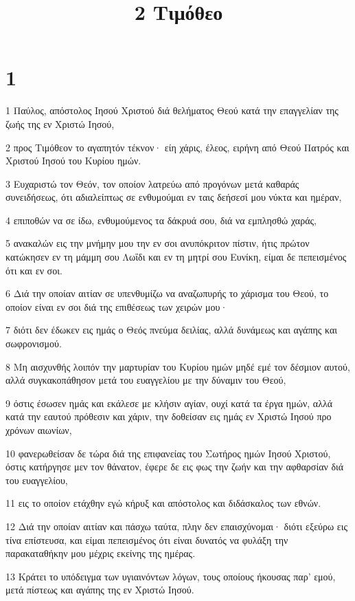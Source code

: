 

\title{2 Τιμόθεο}


\chapter{1}

\par 1 Παύλος, απόστολος Ιησού Χριστού διά θελήματος Θεού κατά την επαγγελίαν της ζωής της εν Χριστώ Ιησού,
\par 2 προς Τιμόθεον το αγαπητόν τέκνον· είη χάρις, έλεος, ειρήνη από Θεού Πατρός και Χριστού Ιησού του Κυρίου ημών.
\par 3 Ευχαριστώ τον Θεόν, τον οποίον λατρεύω από προγόνων μετά καθαράς συνειδήσεως, ότι αδιαλείπτως σε ενθυμούμαι εν ταις δεήσεσί μου νύκτα και ημέραν,
\par 4 επιποθών να σε ίδω, ενθυμούμενος τα δάκρυά σου, διά να εμπλησθώ χαράς,
\par 5 ανακαλών εις την μνήμην μου την εν σοι ανυπόκριτον πίστιν, ήτις πρώτον κατώκησεν εν τη μάμμη σου Λωΐδι και εν τη μητρί σου Ευνίκη, είμαι δε πεπεισμένος ότι και εν σοι.
\par 6 Διά την οποίαν αιτίαν σε υπενθυμίζω να αναζωπυρής το χάρισμα του Θεού, το οποίον είναι εν σοι διά της επιθέσεως των χειρών μου·
\par 7 διότι δεν έδωκεν εις ημάς ο Θεός πνεύμα δειλίας, αλλά δυνάμεως και αγάπης και σωφρονισμού.
\par 8 Μη αισχυνθής λοιπόν την μαρτυρίαν του Κυρίου ημών μηδέ εμέ τον δέσμιον αυτού, αλλά συγκακοπάθησον μετά του ευαγγελίου με την δύναμιν του Θεού,
\par 9 όστις έσωσεν ημάς και εκάλεσε με κλήσιν αγίαν, ουχί κατά τα έργα ημών, αλλά κατά την εαυτού πρόθεσιν και χάριν, την δοθείσαν εις ημάς εν Χριστώ Ιησού προ χρόνων αιωνίων,
\par 10 φανερωθείσαν δε τώρα διά της επιφανείας του Σωτήρος ημών Ιησού Χριστού, όστις κατήργησε μεν τον θάνατον, έφερε δε εις φως την ζωήν και την αφθαρσίαν διά του ευαγγελίου,
\par 11 εις το οποίον ετάχθην εγώ κήρυξ και απόστολος και διδάσκαλος των εθνών.
\par 12 Διά την οποίαν αιτίαν και πάσχω ταύτα, πλην δεν επαισχύνομαι· διότι εξεύρω εις τίνα επίστευσα, και είμαι πεπεισμένος ότι είναι δυνατός να φυλάξη την παρακαταθήκην μου μέχρις εκείνης της ημέρας.
\par 13 Κράτει το υπόδειγμα των υγιαινόντων λόγων, τους οποίους ήκουσας παρ' εμού, μετά πίστεως και αγάπης της εν Χριστώ Ιησού.
